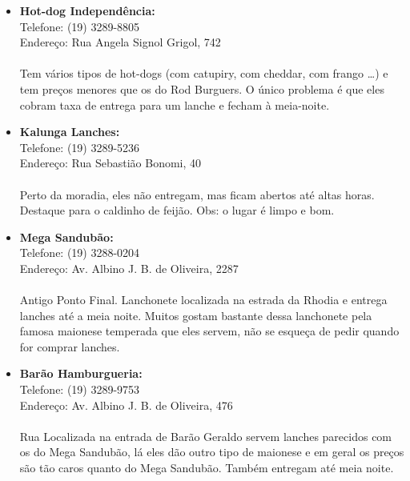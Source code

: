 \begin{itemize}
    \item   \textbf{Hot-dog Independência:}
        \\Telefone: (19) 3289-8805
        \\Endereço: Rua Angela Signol Grigol, 742
        \\\\
        Tem vários tipos de hot-dogs (com catupiry, com cheddar, com frango
        {\dots}) e tem preços menores que os do Rod Burguers. O único problema é
        que eles cobram taxa de entrega para um lanche e fecham à meia-noite.

    \item   \textbf{Kalunga Lanches:}
        \\Telefone: (19) 3289-5236
        \\Endereço: Rua Sebastião Bonomi, 40
        \\\\
        Perto da moradia, eles não entregam, mas ficam abertos até altas horas.
        Destaque para o caldinho de feijão. Obs: o lugar é limpo e bom.

    \item   \textbf{Mega Sandubão:}
        \\Telefone: (19) 3288-0204
        \\Endereço: Av. Albino J. B. de Oliveira, 2287
        \\\\
        Antigo Ponto Final. Lanchonete localizada na estrada da Rhodia e entrega
        lanches até a meia noite. Muitos gostam bastante dessa lanchonete pela
        famosa maionese temperada que eles servem, não se esqueça de pedir
        quando for comprar lanches.

    \item   \textbf{Barão Hamburgueria:}
        \\Telefone: (19) 3289-9753
        \\Endereço: Av. Albino J. B. de Oliveira, 476
        \\\\
        Rua Localizada na entrada de Barão Geraldo servem lanches parecidos com
        os do Mega Sandubão, lá eles dão outro tipo de maionese e em geral os
        preços são tão caros quanto do Mega Sandubão. Também entregam até meia
        noite.


\end{itemize}
